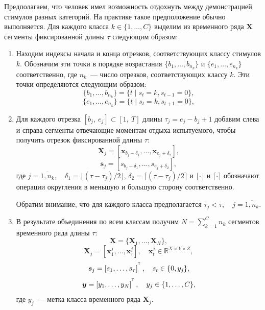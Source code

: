 \documentclass[a4paper, 12pt]{extarticle}
\begin{document}
Предполагаем, что человек имел возможность отдохнуть между демонстрацией стимулов разных категорий. 
На практике такое предположение обычно выполняется.
Для каждого класса $k \in \{1,\dots,C\}$ выделим из временного ряда $\bm{X}$ сегменты фиксированной длины $\tau$ следующим образом:
\begin{enumerate}
	\item Находим индексы начала и конца отрезков, соответствующих классу стимулов $k$. 
	Обозначим эти точки в порядке возрастания $\{b_{1}, \ldots, b_{n_{k}}\}$ и $\{e_{1}, \ldots, e_{n_{k}}\}$ соответственно, 
	где $n_{k}$~--- число отрезков, соответствующих классу $k$. 
	Эти точки определяются следующим образом:
	\begin{equation*}
	\{b_{1}, \ldots, b_{n_{k}}\} = \{t \mid {s}_{t}=k, {s}_{t-1}=0\},
	\end{equation*}
	\begin{equation*}
	\{e_{1}, \ldots, e_{n_{k}}\} = \{t \mid {s}_{t}=k, {s}_{t+1}=0\},
	\end{equation*}

	\item Для каждого отрезка $[b_{j},~e_{j}] \subset [1,~T]$ длины $\tau_{j} = e_{j} - b_{j} + 1$ добавим слева и 
	справа сегменты отвечающие моментам отдыха испытуемого,  
	чтобы получить отрезок фиксированной длины $\tau$:
	\begin{equation*}
	\bm{X}_{j} = [\bm{x}_{b_{j}-\delta_1}, \ldots, \bm{x}_{e_{j}+\delta_2}],
	\end{equation*}
	\begin{equation*}
		\bm{s}_{j} = [s_{b_{j}-\delta_1}, \ldots, s_{e_{j}+\delta_2}],
	\end{equation*}
	где $j = \overline{1, n_{k}}, \quad \delta_1 = \lfloor (\tau - \tau_{j})/2 \rfloor$, $\delta_2 = \lceil (\tau - \tau_{j})/2 \rceil$ и $\lfloor \cdot \rfloor$ и $\lceil \cdot \rceil$ обозначают операции округления в меньшую и большую сторону соответственно.
        
	Обратим внимание, что для каждого класса предполагается $\tau_{j} < \tau,\quad j=\overline{1, n_k}$.

	\item В результате объединения по всем классам получим $N = \sum_{k=1}^C n_k$ сегментов временного ряда длины $\tau$:
	\begin{equation*} 
		\bm{X} = \{\bm{X}_1,\dots, \bm{X}_{N}\},
	\end{equation*}
	\begin{equation*}
		\bm{X}_j = [\bm{x}_{1}^j, \ldots, \bm{x}_{\tau}^j], \quad
		\bm{x}_{t}^j \in \mathbb{R}^{X \times Y \times Z},
	\end{equation*}
	$$\bm{s}_j = \left[s_1, \dots, s_{\tau}\right]^{^{\mathsf{T}}}, \quad s_t \in \{0, y_j\},$$
	$$\bm{y} = \left[y_1, \dots, y_{N}\right]^{^{\mathsf{T}}},\quad y_j \in \{1,\dots, C\},$$
	где $y_j$~--- метка класса временного ряда $\bm{X}_j$.
\end{enumerate}
\end{document}
